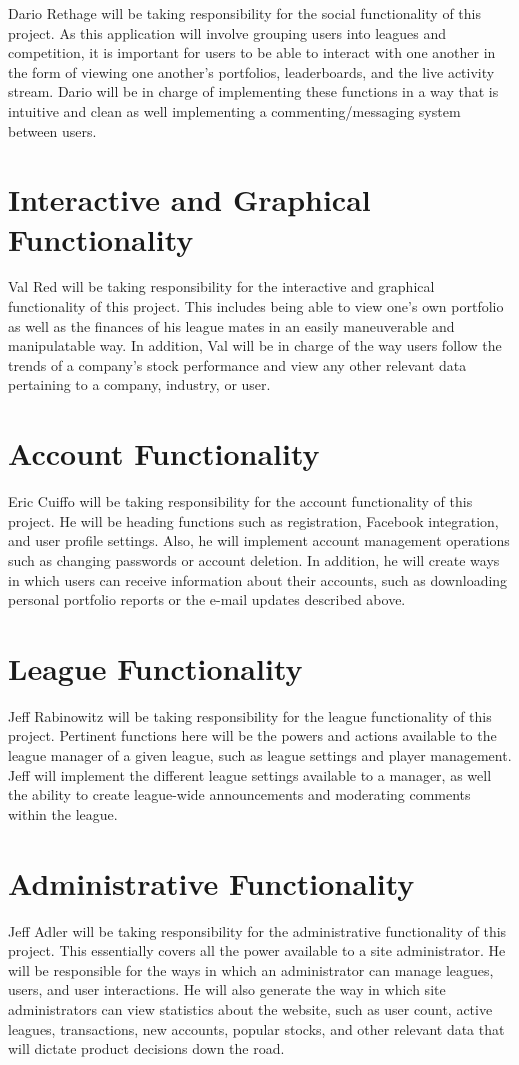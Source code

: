 \documentclass[11pt,letterpaper,oneside]{memoir}
\begin{document}
Dario Rethage will be taking responsibility for the social functionality of this project. As this
application will involve grouping users into leagues and competition, it is important for users
to be able to interact with one another in the form of viewing one another's portfolios,
leaderboards, and the live activity stream. Dario will be in charge of implementing these functions
in a way that is intuitive and clean as well implementing a commenting/messaging system
between users.

\section{Interactive and Graphical Functionality}

Val Red will be taking responsibility for the interactive and graphical functionality of this project.
This includes being able to view one's own portfolio as well as the finances of his league mates in
an easily maneuverable and manipulatable way. In addition, Val will be in charge of the way
users follow the trends of a company's stock performance and view any other relevant data
pertaining to a company, industry, or user.

\section{Account Functionality}
Eric Cuiffo will be taking responsibility for the account functionality of this project. He will be
heading functions such as registration, Facebook integration, and user profile settings. Also,
he will implement account management operations such as changing passwords or account deletion.
In addition, he will create ways in which users can receive information about their accounts, such
as downloading personal portfolio reports or the e-mail updates described above.

\section{League Functionality}
Jeff Rabinowitz will be taking responsibility for the league functionality of this project. Pertinent
functions here will be the powers and actions available to the league manager of a given league,
such as league settings and player management. Jeff will implement the different league
settings available to a manager, as well the ability to create league-wide announcements and
moderating comments within the league.

\section{Administrative Functionality}

Jeff Adler will be taking responsibility for the administrative functionality of this project. This essentially
covers all the power available to a site administrator. He will be responsible for the ways in which an
administrator can manage leagues, users, and user interactions. He will also generate the way in which
site administrators can view statistics about the website, such as user count, active leagues, transactions,
new accounts, popular stocks, and other relevant data that will dictate product decisions down the road.
\end{document}
